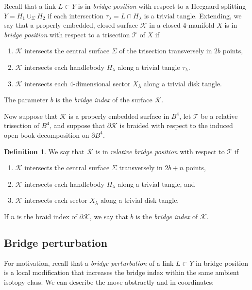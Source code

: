 \documentclass[11pt]{amsart}
\theoremstyle{definition}
\newtheorem{definition}[theorem]{Definition}
\theoremstyle{remark}
\numberwithin{equation}{section}
\newcommand{\cT}{\mathcal{T}}
\newcommand{\cK}{\mathcal{K}}
\newcommand{\del}{\partial}
\begin{document}
Recall that a link $L \subset Y$ is in {\it bridge position} with respect to a Heegaard splitting $Y = H_1 \cup_{\Sigma} H_2$ if each intersection $\tau_{\lambda} = L \cap H_{\lambda}$ is a trivial tangle.  Extending, we say that a properly embedded, closed surface $\cK$ in a closed 4-manifold $X$ is in {\it bridge position} with respect to a trisection $\cT$ of $X$ if
\begin{enumerate}
    \item $\cK$ intersects the central surface $\Sigma$ of the trisection transversely in $2b$ points,
    \item $\cK$ intersects each handlebody $H_{\lambda}$ along a trivial tangle $\tau_{\lambda}$.
    \item $\cK$ intersects each 4-dimensional sector $X_{\lambda}$ along a trivial disk tangle.
\end{enumerate}
The parameter $b$ is the {\it bridge index} of the surface $\cK$.

Now suppose that $\cK$ is a properly embedded surface in $B^4$, let $\cT$ be a relative trisection of $B^4$, and suppose that $\del \cK$ is braided with respect to the induced open book decomposition on $\del B^4$.  

\begin{definition}
We say that $\cK$ is in {\it relative bridge position} with respect to $\cT$ if
\begin{enumerate}
    \item $\cK$ intersects the central surface $\Sigma$ transversely in $2b + n$ points,
    \item $\cK$ intersects each handlebody $H_{\lambda}$ along a trivial tangle, and
    \item $\cK$ intersects each sector $X_{\lambda}$ along a trivial disk-tangle.
\end{enumerate}
If $n$ is the braid index of $\del \cK$, we say that $b$ is the {\it bridge index} of $\cK$.
\end{definition}

\subsection{Bridge perturbation}
\label{sub:bridge-perturbation}

For motivation, recall that a {\it bridge perturbation} of a link $L \subset Y$ in bridge position is a local modification that increases the bridge index within the same ambient isotopy class.  We can describe the move abstractly and in coordinates:
\end{document}
